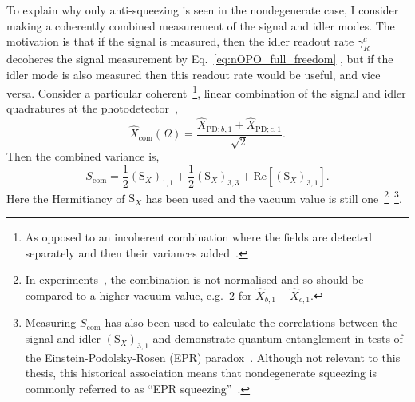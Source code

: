 To explain why only anti-squeezing is seen in the nondegenerate case, I consider making a coherently combined measurement of the signal and idler modes. The motivation is that if the signal is measured, then the idler readout rate $\gamma^c_R$ decoheres the signal measurement by Eq.~\ref{eq:nOPO_full_freedom} , but if the idler mode is also measured then this readout rate would be useful, and vice versa. Consider a particular coherent~\footnote{As opposed to an incoherent combination where the fields are detected separately and then their variances added~\cite{}.}, linear combination of the signal and idler quadratures at the photodetector~\cite{schoriNarrowbandFrequencyTunable2002}, 
\begin{equation}\label{eq:Xcom_eg}
\hat X_\text{com}(\Omega)=\frac{\hat X_{\text{PD};b,1}+\hat X_{\text{PD};c,1}}{\sqrt{2}}.
\end{equation} 
Then the combined variance is, %
\begin{equation}\label{eq:Scom_nOPO_eg}
S_\text{com}=\frac{1}{2}(\text{S}_X)_{1,1}+\frac{1}{2}(\text{S}_X)_{3,3}+\text{Re}[(\text{S}_X)_{3,1}].
\end{equation} 
Here the Hermitiancy of $\text{S}_X$ has been used and the vacuum value is still one~\footnote{In experiments~\cite{schoriNarrowbandFrequencyTunable2002}, the combination is not normalised and so should be compared to a higher vacuum value, e.g.\ $2$ for $\hat X_{b,1} + \hat X_{c,1}$.}~\footnote{Measuring $S_\text{com}$ has also been used to calculate the correlations between the signal and idler $(\text{S}_X)_{3,1}$ and demonstrate quantum entanglement in tests of the Einstein-Podolsky-Rosen (EPR) paradox~\cite{PhysRev.47.777,reidDemonstrationEinsteinPodolskyRosenParadox1989,schoriNarrowbandFrequencyTunable2002}. Although not relevant to this thesis, this historical association means that nondegenerate squeezing is commonly referred to as ``EPR squeezing''~\cite{}.}. 
